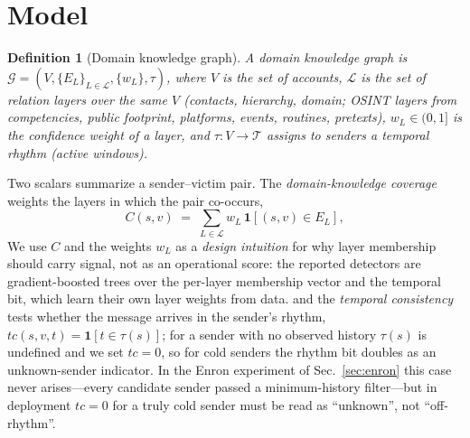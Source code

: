 \documentclass[conference]{IEEEtran}
\newtheorem{definition}{Definition}
\begin{document}
\section{Model}
\label{sec:model}

\begin{definition}[Domain knowledge graph]
\label{def:dkg}
A domain knowledge graph is $\mathcal{G}=(V,\{E_L\}_{L\in\mathcal{L}},\{w_L\},\tau)$, where $V$ is the set of
accounts, $\mathcal{L}$ is the set of relation \emph{layers} over the \emph{same} $V$ (contacts, hierarchy,
domain; OSINT layers from competencies, public footprint, platforms, events, routines, pretexts), $w_L\in(0,1]$
is the confidence weight of a layer, and $\tau:V\to\mathcal{T}$ assigns to senders a \emph{temporal rhythm}
(active windows).
\end{definition}

\noindent Two scalars summarize a sender--victim pair. The \emph{domain-knowledge coverage} weights the
layers in which the pair co-occurs,
\begin{equation}
C(s,v)\;=\;\sum_{L\in\mathcal{L}} w_L\,\mathbf{1}\!\left[(s,v)\in E_L\right],
\label{eq:coverage}
\end{equation}
We use $C$ and the weights $w_L$ as a \emph{design intuition} for why layer membership should carry
signal, not as an operational score: the reported detectors are gradient-boosted trees over the
per-layer membership vector and the temporal bit, which learn their own layer weights from data.
and the \emph{temporal consistency} tests whether the message arrives in the sender's rhythm,
$tc(s,v,t)=\mathbf{1}[t\in\tau(s)]$; for a sender with no observed history $\tau(s)$ is undefined and we set
$tc=0$, so for cold senders the rhythm bit doubles as an unknown-sender indicator. In the Enron experiment of
Sec.~\ref{sec:enron} this case never arises---every candidate sender passed a minimum-history filter---but in
deployment $tc{=}0$ for a truly cold sender must be read as ``unknown'', not ``off-rhythm''.
\end{document}
